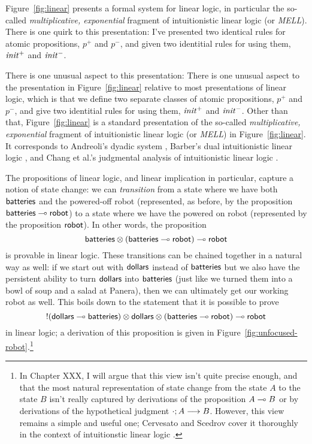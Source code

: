 Figure~\ref{fig:linear} presents a formal system for linear logic, in
particular the so-called {\it multiplicative, exponential} fragment of
intuitionistic linear logic (or {\it MELL}). There is one quirk to
this presentation: I've presented two identical rules for atomic
propositions, $p^+$ and $p^-$, and given two identitial rules for using
them, ${\it init}^+$ and ${\it init}^-$.

There is one unusual aspect to this presentation: 
There is one unusual aspect to the presentation in
Figure~\ref{fig:linear} relative to most presentations of linear
logic, which is that we define two separate classes of atomic
propositions, $p^+$ and $p^-$, and give two identitial rules for using
them, ${\it init}^+$ and ${\it init}^-$. Other than that,
Figure~\ref{fig:linear} is a standard presentation of the so-called
{\it multiplicative, exponential} fragment of intuitionistic linear
logic (or {\it MELL}) in Figure~\ref{fig:linear}. It corresponds to
Andreoli's dyadic system \cite{andreoli92logic}, Barber's dual
intuitionistic linear logic \cite{barber96dual}, and Chang et al.'s
judgmental analysis of intuitionistic linear logic
\cite{chang03judgmental}.  

The propositions of linear logic, and linear implication in
particular, capture a notion of state change: we can {\it transition}
from a state where we have both ${\sf batteries}$ and the powered-off
robot (represented, as before, by the proposition ${\sf batteries}
\multimap {\sf robot}$) to a state where we have the powered on robot
(represented by the proposition ${\sf robot}$). In other words, the
proposition
%
\[{\sf batteries} \otimes ({\sf batteries} \multimap {\sf robot}) \multimap
{\sf robot}\] 
%
is provable in linear logic. These transitions can be chained
together in a natural way as well: if we start out with ${\sf
  dollars}$ instead of ${\sf batteries}$ but we also have the
persistent ability to turn ${\sf dollars}$ into ${\sf batteries}$
(just like we turned them into a bowl of soup and a salad at Panera),
then we can ultimately get our working robot as well. This boils down
to the statement that it is possible to prove
\[{!}({\sf dollars} \multimap {\sf batteries}) \otimes {\sf dollars}
\otimes ({\sf batteries} \multimap {\sf robot}) \multimap {\sf robot}\] in
linear logic; a derivation of this proposition is given in
Figure~\ref{fig:unfocused-robot}.\footnote{In Chapter XXX, I will
  argue that this view isn't quite precise enough, and that the most
  natural representation of state change from the state $A$ to the
  state $B$ isn't really captured by derivations of the proposition $A
  \multimap B$ or by derivations of the hypothetical judgment
  ${\cdot};{A} \longrightarrow {B} \mathstrut$.  However, this view remains a simple and useful
  one; Cervesato and Scedrov cover it thoroughly in the context of
  intuitionstic linear logic \cite{cervesato09relating}.}

